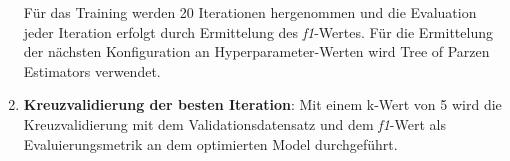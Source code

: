 \begin{enumerate}
    Für das Training werden 20 Iterationen hergenommen und die Evaluation jeder Iteration erfolgt durch Ermittelung des \textit{f1}-Wertes. Für die Ermittelung der nächsten Konfiguration an Hyperparameter-Werten wird Tree of Parzen Estimators verwendet.
    \item \textbf{Kreuzvalidierung der besten Iteration}: Mit einem k-Wert von 5 wird die Kreuzvalidierung mit dem Validationsdatensatz und dem \textit{f1}-Wert als Evaluierungsmetrik an dem optimierten Model durchgeführt.
\end{enumerate}